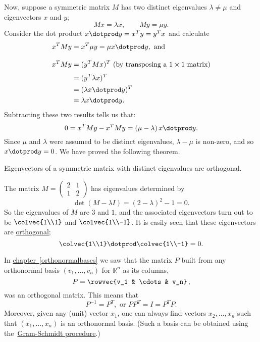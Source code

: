 Now, suppose a symmetric matrix $M$ has two distinct eigenvalues $\lambda \neq \mu$ and eigenvectors $x$ and $y$;
\[
Mx=\lambda x, \qquad My=\mu y.
\] 
Consider the dot product $x\dotprod y = x^Ty = y^Tx$ and calculate
\begin{align*}
x^TM y &= x^T\mu y = \mu x\dotprod y, \text{ and }\\[3mm]
x^TM y &= (y^TMx)^T \text{ (by transposing a $1\times 1$ matrix)}\\[1mm]
       &= (y^T\lambda x)^T \\
       &= (\lambda x\dotprod y)^T \\
       &= \lambda x\dotprod y.
\end{align*}
Subtracting these two results tells us that:
\[
0 = x^TMy-x^TMy=(\mu-\lambda)\,x\dotprod y.
\]
Since $\mu$ and $\lambda$ were assumed to be distinct eigenvalues, $\lambda-\mu$ is non-zero, and so $x\dotprod y=0$.  We have proved the following theorem.

\begin{theorem}
Eigenvectors of a symmetric matrix with distinct eigenvalues are orthogonal.
\end{theorem}


\begin{example}
The matrix $M=\begin{pmatrix}2&1\\1&2\end{pmatrix}$
has eigenvalues determined by
\[
\det(M-\lambda I)=(2-\lambda)^2-1=0.
\] 
So the eigenvalues of $M$ are $3$ and $1$, and the associated eigenvectors turn out to be 
$\colvec{1\\1}$ and $\colvec{1\\-1}$.  It is easily seen that these eigenvectors are \hyperref[orthogonal]{orthogonal}; 
\[
\colvec{1\\1} \dotprod \colvec{1\\-1}=0.
\]
\end{example}

In \hyperlink{basisorthog}{chapter~\ref{orthonormalbases}} we saw that the matrix $P$ built from any orthonormal basis  $(v_1,\ldots, v_n )$
for ${\mathbb R}^n$ as its columns,
\[
P=\rowvec{v_1 & \cdots & v_n}\, ,
\]
was an orthogonal matrix. This means that 
\[
P^{-1}=P^T, \text{ or } PP^T=I=P^TP.
\]
Moreover, given any (unit) vector $x_1$, one can always find vectors $x_2, \ldots, x_n$ such that $(x_1,\ldots, x_n)$ is an orthonormal basis.  (Such a basis can be obtained using the~\hyperref[GramSchmidt]{Gram-Schmidt procedure}.)

